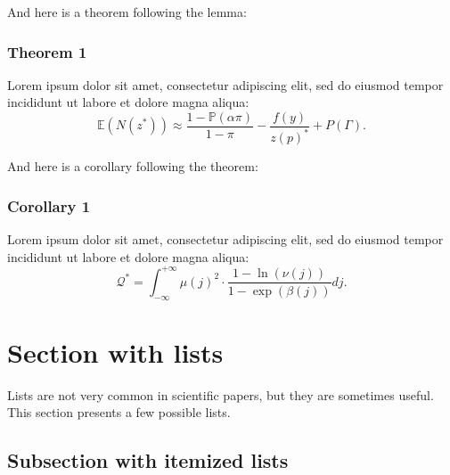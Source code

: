 \documentclass{article}
\begin{document}
 \wcTpLoremIpsum*[type=sentence,words-per-sentence=131,seed=130]{} 

 \wcTpLoremIpsum*[type=sentence,words-per-sentence=30,seed=131]{}  And here is a theorem following the lemma:
\subsubsection*{Theorem 1}
 
Lorem ipsum dolor sit amet, consectetur adipiscing elit, sed do eiusmod tempor incididunt ut labore et dolore magna aliqua:
\[

\mathbb{E}(N(z^*)) \approx \frac{1-\mathbb{P}(\alpha\pi)}{1-\pi}- \frac{f(y)}{z(p)^*} + P(\Gamma).

\]
 \wcTpLoremIpsum*[type=sentence,words-per-sentence=17,seed=132]{} 


 \wcTpLoremIpsum*[type=sentence,words-per-sentence=30,seed=133]{}  And here is a corollary following the theorem:
\subsubsection*{Corollary 1}
 
Lorem ipsum dolor sit amet, consectetur adipiscing elit, sed do eiusmod tempor incididunt ut labore et dolore magna aliqua:
\[

\mathcal{Q}^* = \int_{-\infty}^{+\infty} \mu(j)^2 \cdot \frac{1-\ln(\nu(j))}{1-\exp(\beta(j))} dj.

\]
 \wcTpLoremIpsum*[type=sentence,words-per-sentence=17,seed=134]{} 


\section{Section with lists}\label{s:lists}

Lists are not very common in scientific papers, but they are sometimes useful. This section presents a few possible lists.

\subsection{Subsection with itemized lists}
\end{document}
